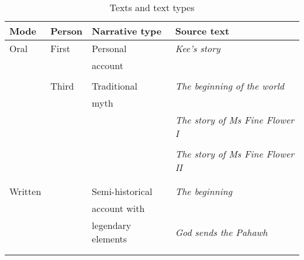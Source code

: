 \documentclass[output=paper]{LSP/langsci}
\begin{document}
\begin{table}[]
\small
\caption{Texts and text types}
\label{Jatable1}
\begin{tabular}{llll}
  \lsptoprule
Mode & Person                  & Narrative type                     & Source text                         \\
\midrule
 Oral & First  					& Personal  						& \textit{Kee's story}       \\
   &                     &    account                            & \citep[][Appendix B]{fuller85}                                   \\
          &                                    &        &                           \\                    
           & Third 					& Traditional 						& \textit{The beginning of the world}                            \\
            &            &  myth                                   & \citep[][Chapter 1]{johnson92}                                        \\
             &           &                                    & \textit{The story of Ms Fine Flower I}                                   \\
            &            &                                    & \citep[][Chapter 5]{johnson92}                                  \\
           &             &                                   & \textit{The story of Ms Fine Flower II}                                   \\
           &             &                                    & \citep[][Chapter 6]{johnson92}                                       \\
                           &                                    &        &                           \\                                           
 Written  &                     &  Semi-historical                                  & \textit{The beginning}         \\
            &            &  account with                                  & \citep[][Chapter 1]{vang90}                                      \\
            &            &  legendary elements                                  & \textit{God sends the Pahawh}                                      \\
            &            &                                    & \citep[][Chapter 2]{vang90}                                    \\
 \lspbottomrule
\end{tabular}
\end{table}
\end{document}
